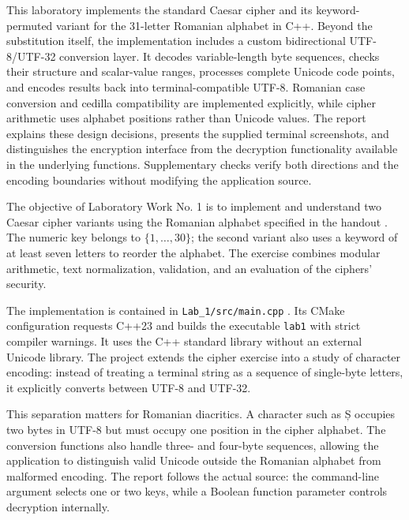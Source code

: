 \documentclass{utmreport}
\begin{document}
\makeutmreporttitlepage
\tableofcontents
\clearpage
\begin{utmabstract}[Abstract]
This laboratory implements the standard Caesar cipher and its keyword-permuted variant for the 31-letter Romanian alphabet in C++. Beyond the substitution itself, the implementation includes a custom bidirectional UTF-8/UTF-32 conversion layer. It decodes variable-length byte sequences, checks their structure and scalar-value ranges, processes complete Unicode code points, and encodes results back into terminal-compatible UTF-8. Romanian case conversion and cedilla compatibility are implemented explicitly, while cipher arithmetic uses alphabet positions rather than Unicode values. The report explains these design decisions, presents the supplied terminal screenshots, and distinguishes the encryption interface from the decryption functionality available in the underlying functions. Supplementary checks verify both directions and the encoding boundaries without modifying the application source.

\end{utmabstract}

\utmintroduction
The objective of Laboratory Work No. 1 is to implement and understand two Caesar cipher variants using the Romanian alphabet specified in the handout \cite{handout}. The numeric key belongs to $\{1,\ldots,30\}$; the second variant also uses a keyword of at least seven letters to reorder the alphabet. The exercise combines modular arithmetic, text normalization, validation, and an evaluation of the ciphers' security.

The implementation is contained in \texttt{Lab\_1/src/main.cpp} \cite{implementation}. Its CMake configuration requests C++23 and builds the executable \texttt{lab1} with strict compiler warnings. It uses the C++ standard library without an external Unicode library. The project extends the cipher exercise into a study of character encoding: instead of treating a terminal string as a sequence of single-byte letters, it explicitly converts between UTF-8 and UTF-32.

This separation matters for Romanian diacritics. A character such as Ș occupies two bytes in UTF-8 but must occupy one position in the cipher alphabet. The conversion functions also handle three- and four-byte sequences, allowing the application to distinguish valid Unicode outside the Romanian alphabet from malformed encoding. The report follows the actual source: the command-line argument selects one or two keys, while a Boolean function parameter controls decryption internally.
\end{document}
